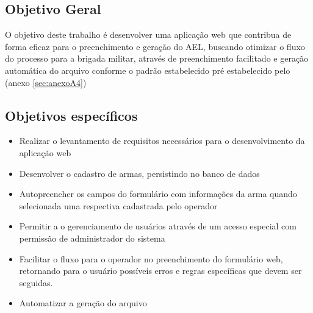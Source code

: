 \subsection{Objetivo Geral}
O objetivo deste trabalho é desenvolver uma aplicação web que contribua de forma eficaz para o preenchimento e geração do AEL, buscando otimizar o fluxo do processo para a brigada militar, através de preenchimento facilitado e geração automática do arquivo conforme o padrão estabelecido pré estabelecido pelo (anexo \ref{sec:anexoA4})

\subsection{Objetivos específicos}
\begin{itemize}
    \item Realizar o levantamento de requisitos necessários para o desenvolvimento da aplicação web 
    \item Desenvolver o cadastro de armas, persistindo no banco de dados 
    \item Autopreencher os campos do formulário com informações da arma quando selecionada uma respectiva cadastrada pelo operador
    \item Permitir a o gerenciamento de usuários através de um acesso especial com permissão de administrador do sistema 
    \item Facilitar o  fluxo para o operador no preenchimento do formulário web, retornando para o usuário possíveis erros e regras específicas que devem ser seguidas.
    \item Automatizar a geração do arquivo
\end{itemize}  

